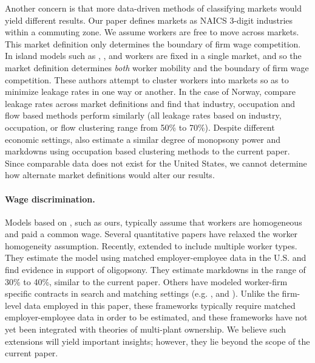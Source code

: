 \documentclass[12pt]{article}
\theoremstyle{prop}
\begin{document}
Another concern is that more data-driven methods of classifying markets would yield different results. 
Our paper defines markets as NAICS 3-digit industries within a commuting zone. We assume workers are free to move across markets. 
This market definition only determines the boundary of firm wage competition. 
In island models such as \citet{berger2023anatomy}, \citet{bagga2023firm}, and \citet{jarosch2024granular} workers are fixed in a single market, and so the market definition determines \textit{both} worker mobility and the boundary of firm wage competition. 
These authors attempt to cluster workers into markets so as to minimize leakage rates in one way or another. 
In the case of Norway, \citet{berger2023anatomy} compare leakage rates across market definitions and find that industry, occupation and flow based methods perform similarly (all leakage rates based on industry, occupation, or flow clustering range from 50\% to 70\%). 
Despite different economic settings, \citet{berger2023anatomy} also estimate a similar degree of monopsony power and markdowns using occupation based clustering methods to the current paper. 
Since comparable data does not exist for the United States, we cannot determine how alternate market definitions would alter our results. 
 
\paragraph{Wage discrimination.} Models based on \citet{Robinson1933}, such as ours, typically assume that workers are homogeneous and paid a common wage. Several quantitative papers have relaxed the worker homogeneity assumption.  Recently, \citet{deb2022drives}  extended \citet{berger2022labor} to include multiple worker types. They estimate the model using matched employer-employee data in the U.S. and find evidence in support of oligopsony. They estimate markdowns in the range of 30\% to 40\%, similar to the current paper. Others have modeled worker-firm specific contracts in search and matching settings (e.g. \citet{bagga2023firm}, \citet{berger2023anatomy} and \citet{jungerman2023dynamic}). Unlike the firm-level data employed in this paper, these frameworks typically require matched employer-employee data in order to be estimated, and these frameworks have not yet been integrated with theories of multi-plant ownership. We believe such extensions will yield important insights; however, they lie beyond the scope of the current paper.
 
\end{document}

